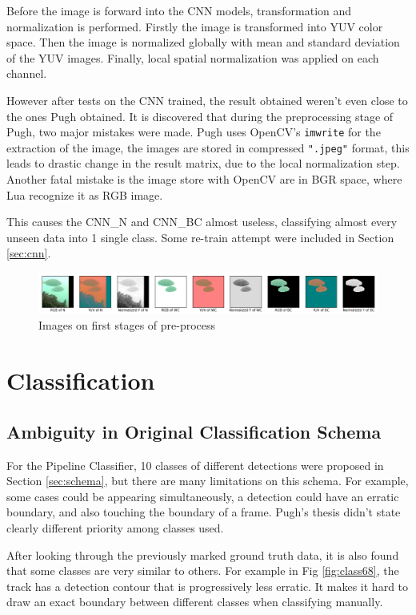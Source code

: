 \documentclass[bsc,logo,twoside,fullspacing,parskip]{infthesis}
\begin{document}
Before the image is forward into the CNN models, transformation and normalization is performed. 
Firstly the image is transformed into YUV color space.
Then the image is normalized globally with mean and standard deviation of the YUV images.
Finally, local spatial normalization was applied on each channel.

However after tests on the CNN trained, the result obtained weren't even close to the ones Pugh obtained.
It is discovered that during the preprocessing stage of Pugh, two major mistakes were made.
Pugh uses OpenCV's {\tt imwrite} for the extraction of the image, the images are stored in compressed {\tt ".jpeg"} format, this leads to drastic change in the result matrix, due to the local normalization step. Another fatal mistake is the image store with OpenCV are in BGR space, where Lua recognize it as RGB image.

This causes the CNN\_N and CNN\_BC almost useless, classifying almost every unseen data into 1 single class. Some re-train attempt were included in Section \ref{sec:cnn}.

\begin{figure}[h]
\centering
    \includegraphics[scale=0.4]{graph/imagepre.png}
    \caption{Images on first stages of pre-process}
    \label{fig:imageprepro}
\end{figure}

\chapter{Classification}

\section{Ambiguity in Original Classification Schema}
\label{AmbigCS}

For the Pipeline Classifier, 10 classes of different detections were proposed in Section \ref{sec:schema}, but there are many limitations on this schema.
For example, some cases could be appearing simultaneously, a detection could have an erratic boundary, and also touching the boundary of a frame. Pugh's thesis didn't state clearly different priority among classes used. 

After looking through the previously marked ground truth data, it is also found that some classes are very similar to others. For example in Fig \ref{fig:class68}, the track has a detection contour that is progressively less erratic. It makes it hard to draw an exact boundary between different classes when classifying manually.
\end{document}
